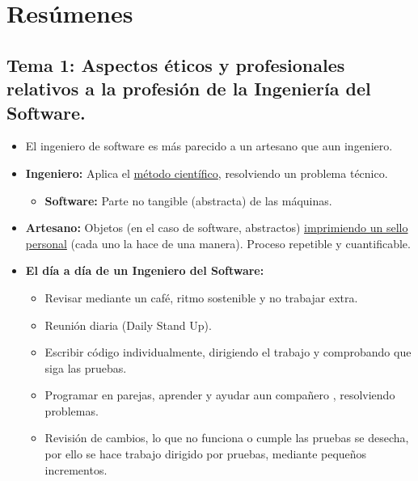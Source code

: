 \documentclass[12pt, twoside, openright]{report} %
\begin{document}






\part{Resúmenes}
\chapter{Tema 1: Aspectos éticos y profesionales relativos a la profesión
de la Ingeniería del Software.}

\begin{itemize}
\item El ingeniero de software es más parecido a un artesano que aun
  ingeniero.
\item \textbf{Ingeniero:} Aplica el \underline{método científico},
  resolviendo un problema técnico.
  

  \begin{itemize}
  \item \textbf{Software:} Parte no tangible (abstracta) de las máquinas.
    
  \end{itemize}
\item \textbf{Artesano:} Objetos (en el caso de software, abstractos)
  \underline{imprimiendo un sello personal} (cada uno la hace de una
  manera). Proceso repetible y cuantificable.
  
\item \textbf{El día a día de un Ingeniero del Software:}
  

  \begin{itemize}
  \item Revisar mediante un café, ritmo sostenible y no trabajar extra.
    
  \item Reunión diaria (Daily Stand Up).
    
  \item Escribir código individualmente, dirigiendo el trabajo y comprobando
    que siga las pruebas.
    
  \item Programar en parejas, aprender y ayudar aun compañero , resolviendo
    problemas.
    
  \item Revisión de cambios, lo que no funciona o cumple las pruebas se
    desecha, por ello se hace trabajo dirigido por pruebas, mediante
    pequeños incrementos.
    

\end{itemize}
\end{itemize}
\end{document}
